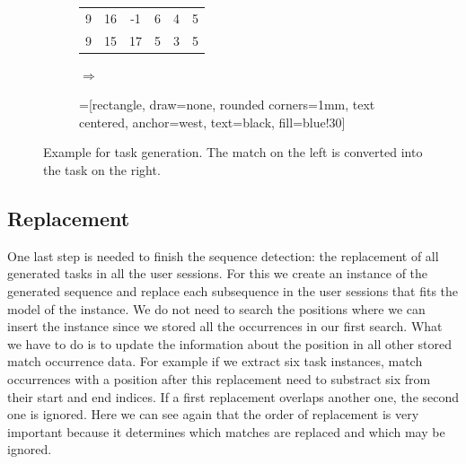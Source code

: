 \begin{figure}[h]
	\centering
	\begin{subfigure}[c]{0.44\textwidth}
		\centering
	\begin{tabular}{cccccc}
		9 & 16 & -1 & 6 & 4& 5\\
		9 & 15 & 17 & 5 & 3& 5\\
	\end{tabular}
	\end{subfigure}
	\begin{subfigure}[c]{0.1\textwidth}
		\centering

		\Large{$\Rightarrow$}
	\end{subfigure}
	\begin{subfigure}[c]{0.44\textwidth}
		=[rectangle, draw=none, rounded corners=1mm,
		        text centered, anchor=west, text=black, fill=blue!30]
		
	\end{subfigure}
	\caption{Example for task generation. The match on the left is converted into the task on the right.}
	\label{fig:matchexampletaskgeneration}
\end{figure}

\subsection{Replacement}
One last step is needed to finish the sequence detection: the replacement of all generated tasks in all the user sessions.
For this we create an instance of the generated sequence and replace each subsequence in the user sessions that fits the model of the instance. 
We do not need to search the positions where we can insert the instance since we stored all the occurrences in our first search. 
What we have to do is to update the information about the position in all other stored match occurrence data. 
For example if we extract six task instances, match occurrences with a position after this replacement need to substract six from their start and end indices.
If a first replacement overlaps another one, the second one is ignored. Here we can see again that the order of replacement is very important  because it determines which 
matches are replaced and which may be ignored.

